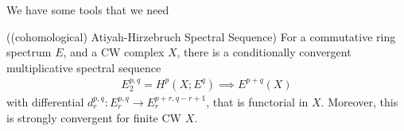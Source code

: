 We have some tools that we need
\begin{theorem}((cohomological) Atiyah-Hirzebruch Spectral Sequence)\cite{PreMcCleary}
    For a commutative ring spectrum $E$, and a CW complex $X$, there is a conditionally convergent multiplicative spectral sequence
    \begin{align*}
        E_2^{p,q}=H^p(X; E^q)\implies E^{p+q}(X)
    \end{align*}with differential $d_r^{p,q}: E_r^{p,q}\to E_r^{p+r,q-r+1}$, that is functorial in $X$. Moreover, this is strongly convergent for finite CW $X$.
\end{theorem}

